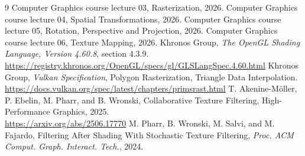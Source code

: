\documentclass[a4paper,11pt]{article}
\begin{document}
\begin{thebibliography}{9}
 Computer Graphics course lecture 03, Rasterization, 2026.
 Computer Graphics course lecture 04, Spatial Transformations, 2026.
 Computer Graphics course lecture 05, Rotation, Perspective and Projection, 2026.
 Computer Graphics course lecture 06, Texture Mapping, 2026.
 Khronos Group, \emph{The OpenGL Shading Language, Version 4.60.8}, section 4.3.9.\\
\url{https://registry.khronos.org/OpenGL/specs/gl/GLSLangSpec.4.60.html}
 Khronos Group, \emph{Vulkan Specification}, Polygon Rasterization, Triangle Data Interpolation.\\
\url{https://docs.vulkan.org/spec/latest/chapters/primsrast.html}
 T. Akenine-M\"oller, P. Ebelin, M. Pharr, and B. Wronski, Collaborative Texture Filtering, High-Performance Graphics, 2025.\\
\url{https://arxiv.org/abs/2506.17770}
 M. Pharr, B. Wronski, M. Salvi, and M. Fajardo, Filtering After Shading With Stochastic Texture Filtering, \emph{Proc. ACM Comput. Graph. Interact. Tech.}, 2024.
\end{thebibliography}
\end{document}
